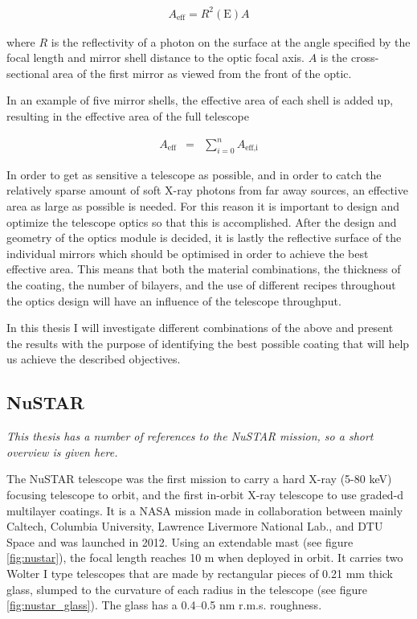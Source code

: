 \begin{eqnarray}
	A_{\text{eff}} = R^2(\text{E}) A
\end{eqnarray}

where $R$ is the reflectivity of a photon on the surface at the angle specified by the focal length and mirror shell distance to the optic focal axis. $A$ is the cross-sectional area of the first mirror as viewed from the front of the optic.

In an example of five mirror shells, the effective area of each shell is added up, resulting in the effective area of the full telescope

\begin{eqnarray}
A_{\text{eff}} &=& \sum_{i=0}^n A_{\text{eff,i}}
\end{eqnarray}

In order to get as sensitive a telescope as possible, and in order to catch the relatively sparse amount of soft X-ray photons from far away sources, an effective area as large as possible is needed. For this reason it is important to design and optimize the telescope optics so that this is accomplished. After the design and geometry of the optics module is decided, it is lastly the reflective surface of the individual mirrors which should be optimised in order to achieve the best effective area. This means that both the material combinations, the thickness of the coating, the number of bilayers, and the use of different recipes throughout the optics design will have an influence of the telescope throughput.

In this thesis I will investigate different combinations of the above and present the results with the purpose of identifying the best possible coating that will help us achieve the described objectives.

\subsection{NuSTAR}\label{sec:nustar}
\emph{This thesis has a number of references to the NuSTAR mission, so a short overview is given here.}

The NuSTAR telescope was the first mission to carry a hard X-ray (5-80 keV) focusing telescope to orbit, and the first in-orbit X-ray telescope to use graded-d multilayer coatings. It is a NASA mission made in collaboration between mainly Caltech, Columbia University, Lawrence Livermore National Lab., and DTU Space and was launched in 2012. Using an extendable mast (see figure \ref{fig:nustar}), the focal length reaches 10 m when deployed in orbit. It carries two Wolter I type telescopes that are made by rectangular pieces of 0.21 mm thick glass, slumped to the curvature of each radius in the telescope\cite{Craig:2000fd,Hailey:1997ie} (see figure \ref{fig:nustar_glass}). The glass has a 0.4--0.5 nm r.m.s. roughness.

